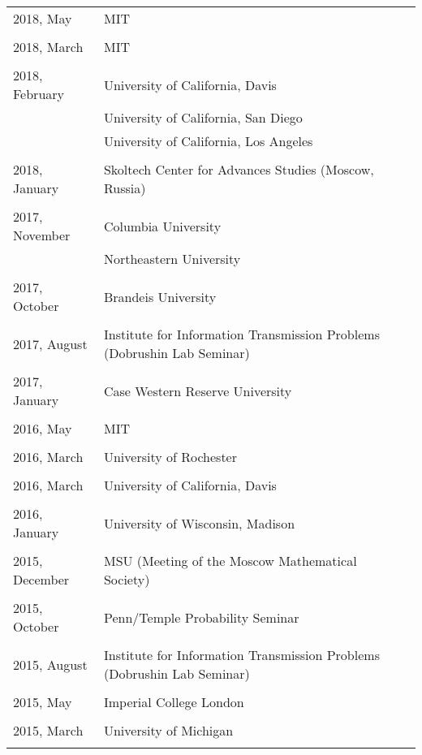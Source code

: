 \documentclass[letterpaper,11pt]{article}
\begin{document}
\begin{longtable}{llc}
	2018, May
	& MIT
	\\\\
	2018, March
	& MIT
	\\\\
	2018, February
	& University of California, Davis
	\\
	& University of California, San Diego
	\\
	& University of California, Los Angeles
	\\\\
	2018, January
	& Skoltech Center for Advances Studies (Moscow, Russia)
	\\\\
	2017, November
	& Columbia University
	\\
	& Northeastern University
	\\\\
	2017, October
	& Brandeis University
	\\\\
	2017, August
	& Institute for Information Transmission Problems
	(Dobrushin Lab Seminar)
	\\\\
	2017, January
	& Case Western Reserve University
	\\\\
	2016, May
	& MIT
	\\\\
	2016, March
	& University of Rochester
	\\\\
	2016, March
	& University of California, Davis
	\\\\
	2016, January
	& University of Wisconsin, Madison
	\\\\
	2015, December
	& MSU (Meeting of the Moscow Mathematical Society)
	\\\\
	2015, October
	& Penn/Temple Probability Seminar
	\\\\

	2015, August
	& Institute for Information Transmission Problems
	(Dobrushin Lab Seminar)
	\\\\

	2015, May
	& Imperial College London
	\\\\

	2015, March
	& University of Michigan
	\\\\


\end{longtable}
\end{document}
